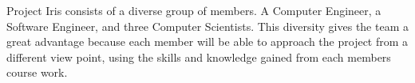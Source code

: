 
Project Iris consists of a diverse group of members.  A Computer Engineer, a Software Engineer, and three Computer Scientists.  This diversity gives the team a great advantage because each member will be able to approach the project from a different view point, using the skills and knowledge gained from each members course work.